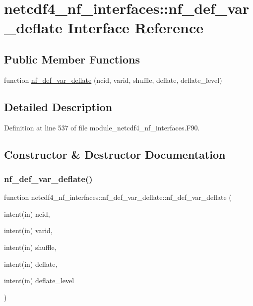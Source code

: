 \hypertarget{interfacenetcdf4__nf__interfaces_1_1nf__def__var__deflate}{}\section{netcdf4\+\_\+nf\+\_\+interfaces\+:\+:nf\+\_\+def\+\_\+var\+\_\+deflate Interface Reference}
\label{interfacenetcdf4__nf__interfaces_1_1nf__def__var__deflate}
\subsection*{Public Member Functions}
\begin{DoxyCompactItemize}
\item 
function \hyperlink{interfacenetcdf4__nf__interfaces_1_1nf__def__var__deflate_a1565bd2d2085cb5d438f01a7edf5d896}{nf\+\_\+def\+\_\+var\+\_\+deflate} (ncid, varid, shuffle, deflate, deflate\+\_\+level)
\end{DoxyCompactItemize}


\subsection{Detailed Description}


Definition at line 537 of file module\+\_\+netcdf4\+\_\+nf\+\_\+interfaces.\+F90.



\subsection{Constructor \& Destructor Documentation}
\mbox{\label{interfacenetcdf4__nf__interfaces_1_1nf__def__var__deflate_a1565bd2d2085cb5d438f01a7edf5d896}} 
\subsubsection{\texorpdfstring{nf\+\_\+def\+\_\+var\+\_\+deflate()}{nf\_def\_var\_deflate()}}
{\footnotesize\ttfamily function netcdf4\+\_\+nf\+\_\+interfaces\+::nf\+\_\+def\+\_\+var\+\_\+deflate\+::nf\+\_\+def\+\_\+var\+\_\+deflate (\begin{DoxyParamCaption}\item[{intent(in)}]{ncid,  }\item[{intent(in)}]{varid,  }\item[{intent(in)}]{shuffle,  }\item[{intent(in)}]{deflate,  }\item[{intent(in)}]{deflate\+\_\+level }\end{DoxyParamCaption})}



